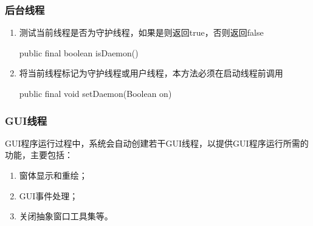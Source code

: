 \begin{frame}[fragile] %
  \frametitle{后台线程}


  \begin{enumerate}\kai
  \item 测试当前线程是否为守护线程，如果是则返回true，否则返回false
    \begin{javaCode}
      public final boolean isDaemon()
    \end{javaCode}
  \item 将当前线程标记为守护线程或用户线程，本方法必须在启动线程前调用
    \begin{javaCode}
      public final void setDaemon(Boolean on)
    \end{javaCode}
  \end{enumerate}

\end{frame}

\begin{frame}[fragile] %
  \frametitle{GUI线程}

  GUI程序运行过程中，系统会自动创建若干GUI线程，以提供GUI程序运行所需的功能，主要包括：

  \begin{enumerate}\kai
  \item 窗体显示和重绘；
  \item GUI事件处理；
  \item 关闭抽象窗口工具集等。
  \end{enumerate}

  
\end{frame}


